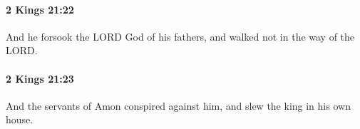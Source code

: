 		\paragraph{2 Kings 21:22} %
			\label{2KINGS-21-22}

			And he forsook the LORD God of his fathers, and walked not in the way of the LORD.


		\paragraph{2 Kings 21:23} %
			\label{2KINGS-21-23}

			And the servants of Amon conspired against him, and slew the king in his own house.


